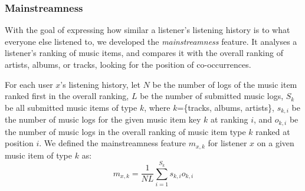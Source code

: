 







\subsubsection{Mainstreamness}\label{subsec:mainstreamness}
	With the goal of expressing how similar a listener's listening history is to what everyone else listened to, we developed the \emph{mainstreamness} feature. It analyses a listener's ranking of music items, and compares it with the overall ranking of artists, albums, or tracks, looking for the position of co-occurrences. %
	

	For each user $x$'s listening history, let 
	$N$ be the number of logs of the music item ranked first in the overall ranking,
    $L$ be the number of submitted music logs,
	$S_k$ be all submitted music items of type $k$, where $k$=\{tracks, albums, artists\},
	$s_{k,i}$ be the number of music logs for the given music item key $k$ at ranking $i$, and
	$o_{k,i}$ be the number of music logs in the overall ranking of music item type $k$ ranked at position $i$.
    	We defined the mainstreamness feature $m_{x,k}$ for listener $x$ on a given music item of type $k$ as:
		\begin{equation}
			\label{eq:mainstreamness}
			m_{x,k}=\frac{1}{N L}\sum_{i=1}^{S_k}{s_{k,i}}{o_{k,i}}
		\end{equation}



